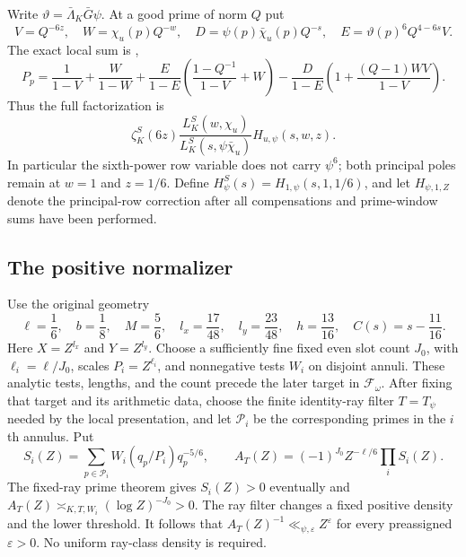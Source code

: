 \documentclass[11pt,a4paper]{article}
\theoremstyle{remark}\newtheorem{remark}[theorem]{Remark}
\newcommand{\eps}{\varepsilon}
\newcommand{\Packet}{\mathscr F_\omega}
\numberwithin{equation}{section}
\begin{document}
Write
$\vartheta=\bar\Lambda_K\bar G\psi$.  At a good prime of norm $Q$ put
\[
 V=Q^{-6z},\quad W=\chi_u(p)Q^{-w},\quad
 D=\psi(p)\bar\chi_u(p)Q^{-s},\quad
 E=\vartheta(p)^6Q^{4-6s}V.
\]
The exact local sum is \cite[(7.19)]{P},
\[
 P_p=\frac1{1-V}+\frac W{1-W}
 +\frac E{1-E}\left(\frac{1-Q^{-1}}{1-V}+W\right)
 -\frac D{1-E}\left(1+\frac{(Q-1)WV}{1-V}\right).
\]
Thus the full factorization is
\[
 \zeta_K^S(6z)\frac{L_K^S(w,\chi_u)}
                         {L_K^S(s,\psi\bar\chi_u)}H_{u,\psi}(s,w,z).
\]
In particular the sixth-power row variable does not carry $\psi^6$;
both principal poles remain at $w=1$ and $z=1/6$. Define
$H_\psi^S(s)=H_{1,\psi}(s,1,1/6)$, and let $H_{\psi,1,Z}$ denote
the principal-row correction after all compensations and prime-window
sums have been performed.

\subsection{The positive normalizer}

Use the original geometry
\begin{equation}\label{eq-geometry}
 \ell=\frac16,\quad b=\frac18,\quad M=\frac56,
 \quad l_x=\frac{17}{48},\quad l_y=\frac{23}{48},
 \quad h=\frac{13}{16},\quad C(s)=s-\frac{11}{16}.
\end{equation}
Here $X=Z^{l_x}$ and $Y=Z^{l_y}$.
Choose a sufficiently fine fixed even slot count $J_0$, with
$\ell_i=\ell/J_0$, scales $P_i=Z^{\ell_i}$, and nonnegative
tests $W_i$ on disjoint annuli. These analytic tests, lengths,
and the count precede the later target in $\Packet$.
After fixing that target and its arithmetic data, choose the
finite identity-ray filter $T=T_\psi$ needed by the local
presentation, and let $\mathcal P_i$ be the corresponding primes
in the $i$th annulus. Put
\begin{equation}\label{eq-normalizer}
 S_i(Z)=\sum_{p\in\mathcal P_i}W_i(q_p/P_i)q_p^{-5/6},
 \qquad A_T(Z)=(-1)^{J_0} Z^{-\ell/6}\prod_iS_i(Z).
\end{equation}
The fixed-ray prime theorem gives $S_i(Z)>0$ eventually and
$A_T(Z)\asymp_{K,T,W_i}(\log Z)^{-J_0}>0$.
The ray filter changes a fixed positive density and the lower
threshold. It follows that $A_T(Z)^{-1}\ll_{\psi,\eps}Z^\eps$
for every preassigned $\eps>0$. No uniform ray-class density
is required.
\end{document}
